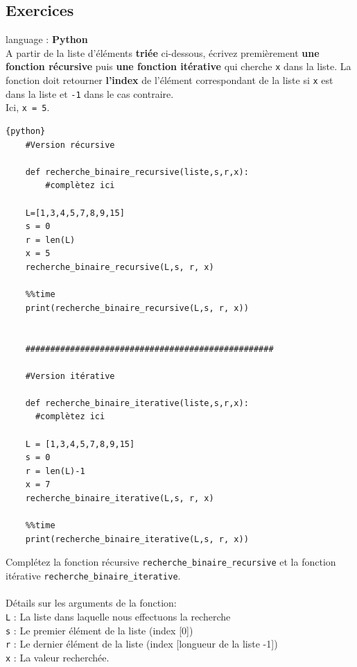 \subsection{Exercices}

\begin{Exercice}[20 minutes] language : \textbf{Python}\\

A partir de la liste d'éléments \textbf{triée} ci-dessous, écrivez premièrement \textbf{une fonction récursive} puis \textbf{une fonction itérative} qui cherche \lstinline{x} dans la liste. La fonction doit retourner \textbf{l'index} de l'élément correspondant de la liste si \lstinline{x} est dans la liste et \lstinline{-1} dans le cas contraire.\\
Ici, \lstinline{x = 5}.\\

\begin{lstlisting}{python}
    #Version récursive
    
    def recherche_binaire_recursive(liste,s,r,x):
        #complètez ici 
    
    L=[1,3,4,5,7,8,9,15]
    s = 0
    r = len(L)
    x = 5
    recherche_binaire_recursive(L,s, r, x)
 
    %%time
    print(recherche_binaire_recursive(L,s, r, x))

    
    ##################################################

    #Version itérative
    
    def recherche_binaire_iterative(liste,s,r,x):
      #complètez ici
      
    L = [1,3,4,5,7,8,9,15]
    s = 0
    r = len(L)-1
    x = 7
    recherche_binaire_iterative(L,s, r, x)
    
    %%time
    print(recherche_binaire_iterative(L,s, r, x))
\end{lstlisting}

    \begin{conseil}
        Complétez la fonction récursive \lstinline{recherche_binaire_recursive} et la fonction itérative \lstinline{recherche_binaire_iterative}.\\\\
        Détails sur les arguments de la fonction:\\
        \lstinline{L} : La liste dans laquelle nous effectuons la recherche\\
        \lstinline{s} : Le premier élément de la liste (index [0])\\
        \lstinline{r} : Le dernier élément de la liste (index [longueur de la liste -1])\\
        \lstinline{x} : La valeur recherchée.\\\\


\end{conseil}
\end{Exercice}
